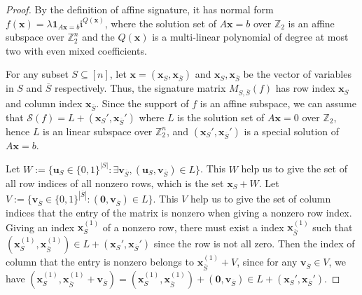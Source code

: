 \begin{proof}
    By the definition of affine signature, it has normal form $f(\mathbf{x})=\lambda \mathbf{1}_{A\mathbf{x}=b}\mathfrak{i}^{Q(\mathbf{x})}$, where the solution set of $A\mathbf x=b$ over $\mathbb Z_2$ is an affine subspace over $\mathbb Z_2^n$ and the $Q(\mathbf{x})$ is a multi-linear polynomial of degree at most two with even mixed coefficients.

    For any subset $S\subseteq [n]$, let $\mathbf{x}=(\mathbf{x}_S,\mathbf{x}_{\overline{S}})$ and  $\mathbf{x}_S,\mathbf{x}_{\overline{S}}$ be the vector of variables in $S$ and $\overline{S}$ respectively. Thus, the signature matrix $M_{S,\overline{S}}(f)$ has row index $\mathbf{x}_S$ and column index $\mathbf{x}_{\overline{S}}$. Since the support of $f$ is an affine subspace, we can assume that $\mathscr{S}(f)=L+(\mathbf{x}_S',\mathbf{x}_{\overline{S}}')$ where $L$ is the solution set of $A\mathbf{x}=0$ over $\mathbb Z_2$, hence $L$ is an linear subspace over $\mathbb{Z}_2^n$, and $(\mathbf{x}_S',\mathbf{x}_{\overline{S}}')$ is a special solution of $A\mathbf{x}=b$.

    Let $W:= \{\mathbf{u}_S\in \{0,1\}^{|S|}: \exists \mathbf{v}_{\overline{S}},(\mathbf{u}_S,\mathbf{v}_{\overline{S}})\in L\}$. This $W$ help us to give the set of all row indices of all nonzero rows, which is the set $\mathbf{x}_S+W$. Let $V:= \{\mathbf{v}_{\overline{S}}\in \{0,1\}^{|\overline{S}|}:(\mathbf{0},\mathbf{v}_{\overline{S}})\in L\}$. This $V$ help us to give the set of column indices that the entry of the matrix is nonzero when giving a nonzero row index. Giving an index $\mathbf{x}_S^{(1)}$ of a nonzero row, there must exist a index $\mathbf{x}_{\overline{S}}^{(1)}$ such that $(\mathbf{x}_S^{(1)},\mathbf{x}_{\overline{S}}^{(1)})\in L+(\mathbf{x}_S',\mathbf{x}_{\overline{S}}')$ since the row is not all zero. Then the index of column that the entry is nonzero belongs to $\mathbf{x}_{\overline{S}}^{(1)}+V$, since for any $\mathbf{v}_{\overline{S}}\in V$, we have $(\mathbf{x}_S^{(1)},\mathbf{x}_{\overline{S}}^{(1)}+\mathbf{v}_{\overline{S}})=(\mathbf{x}_S^{(1)},\mathbf{x}_{\overline{S}}^{(1)})+(\mathbf{0},\mathbf{v}_{\overline{S}})\in L+(\mathbf{x}_S',\mathbf{x}_{\overline{S}}').$ 
    

\end{proof}
